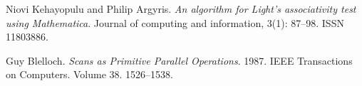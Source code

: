 \begin{thebibliography}{1}


Niovi Kehayopulu and Philip Argyris. \emph{An algorithm for Light's
associativity test using Mathematica}. Journal of computing and information,
3(1): 87--98. ISSN 11803886.


Guy Blelloch. \emph{Scans as Primitive Parallel Operations}. 1987. IEEE
Transactions on Computers. Volume 38. 1526--1538.

\end{thebibliography}
